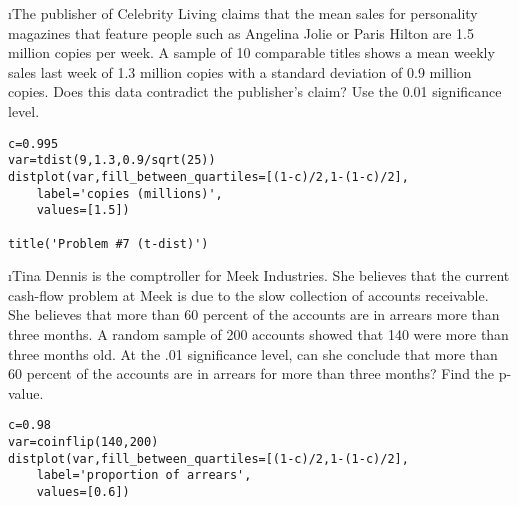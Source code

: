 \newpage
\i The publisher of Celebrity Living claims that the mean sales for personality magazines that feature people such as Angelina Jolie or Paris Hilton are 1.5 million copies per week. A sample of 10 comparable titles shows a mean weekly sales last week of 1.3 million copies with a standard deviation of 0.9 million copies. Does this data contradict the publisher's claim? Use the 0.01 significance level. 
\begin{lstlisting}
c=0.995
var=tdist(9,1.3,0.9/sqrt(25))
distplot(var,fill_between_quartiles=[(1-c)/2,1-(1-c)/2],
    label='copies (millions)',
    values=[1.5])
    
title('Problem #7 (t-dist)')
\end{lstlisting}
\newpage
\i Tina Dennis is the comptroller for Meek Industries. She believes that the current cash-flow problem at Meek is due to the slow collection of accounts receivable. She believes that more than 60 percent of the accounts are in arrears more than three months. A random sample of 200 accounts showed that 140 were more than three months old. At the .01 significance level, can she conclude that more than 60 percent of the accounts are in arrears for more than three months? Find the p-value.
\begin{lstlisting}
c=0.98
var=coinflip(140,200)
distplot(var,fill_between_quartiles=[(1-c)/2,1-(1-c)/2],
    label='proportion of arrears',
    values=[0.6])
\end{lstlisting}


\ee